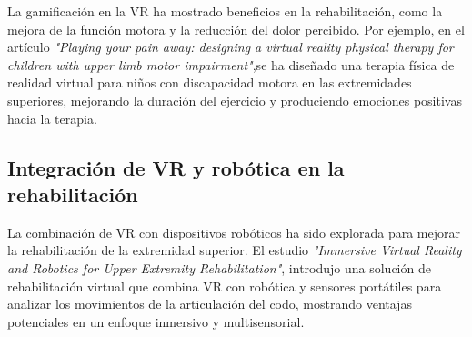 La gamificación en la VR ha mostrado beneficios en la rehabilitación, como la mejora de la función motora y la reducción del dolor percibido. Por ejemplo, en el artículo\textit{ "Playing your pain away: designing a virtual reality physical therapy for children with upper limb motor impairment"}\cite{vr_kids_pain2023},se ha diseñado una terapia física de realidad virtual para niños con discapacidad motora en las extremidades superiores, mejorando la duración del ejercicio y produciendo emociones positivas hacia la terapia.

\subsection{Integración de VR y robótica en la rehabilitación}

La combinación de VR con dispositivos robóticos ha sido explorada para mejorar la rehabilitación de la extremidad superior. El estudio \textit{"Immersive Virtual Reality and Robotics for Upper Extremity Rehabilitation"}\cite{vr_robotics2023}, introdujo una solución de rehabilitación virtual que combina VR con robótica y sensores portátiles para analizar los movimientos de la articulación del codo, mostrando ventajas potenciales en un enfoque inmersivo y multisensorial.